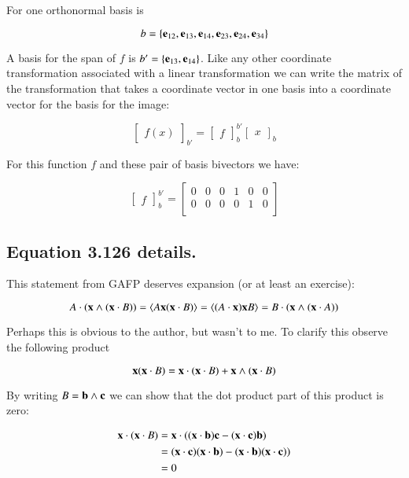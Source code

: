 \documentclass{article}      %
\begin{document}
For  one orthonormal basis is

\[
b = \{ 
\mathbf{e}_{12},
\mathbf{e}_{13},
\mathbf{e}_{14},
\mathbf{e}_{23},
\mathbf{e}_{24},
\mathbf{e}_{34}
\}
\]

A basis for the span of $f$ is $b' = \{
\mathbf{e}_{13},
\mathbf{e}_{14}
\}$.  Like any other coordinate transformation associated with a linear transformation we can write the matrix of the transformation that
takes a coordinate vector in one basis into a coordinate vector for the basis for the image:

\[
{\begin{bmatrix}
f(x)
\end{bmatrix}}_{b'}
=
{\begin{bmatrix}
f
\end{bmatrix}}_b^{b'}
{\begin{bmatrix}
x
\end{bmatrix}}_{b}
\] 

For this function $f$ and these pair of basis bivectors we have:

\[
{\begin{bmatrix}
f
\end{bmatrix}}_b^{b'}
= 
\begin{bmatrix}
0 & 0 & 0 & 1 & 0 & 0 \\
0 & 0 & 0 & 0 & 1 & 0 \\
\end{bmatrix}
\]

\subsection{ Equation 3.126 details. }

This statement from GAFP deserves expansion (or at least an exercise):

\[
A \cdot ( \mathbf{x} \wedge (\mathbf{x} \cdot B) )
= \langle{A \mathbf{x}(\mathbf{x}\cdot B)}\rangle
= \langle (A \cdot \mathbf{x}) \mathbf{x} B \rangle
= B \cdot ( \mathbf{x} \wedge (\mathbf{x} \cdot A) )
\]

Perhaps this is obvious to the author, but wasn't to me.  To clarify this observe the following product

\[
\mathbf{x} ( \mathbf{x} \cdot B ) = \mathbf{x} \cdot ( \mathbf{x} \cdot B ) + \mathbf{x} \wedge ( \mathbf{x} \cdot B ) 
\]

By writing $B = \mathbf{b} \wedge \mathbf{c}$ we can show that the dot product part of this product is zero:

\begin{align*}
\mathbf{x} \cdot ( \mathbf{x} \cdot B ) 
&= \mathbf{x} \cdot ( (\mathbf{x} \cdot \mathbf{b}) \mathbf{c} - (\mathbf{x} \cdot \mathbf{c}) \mathbf{b} ) \\
&= (\mathbf{x} \cdot \mathbf{c}) (\mathbf{x} \cdot \mathbf{b}) - (\mathbf{x} \cdot \mathbf{b}) (\mathbf{x} \cdot \mathbf{c})) \\
&= 0
\end{align*}
\end{document}
